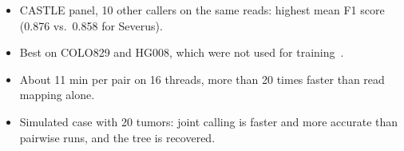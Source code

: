{\begin{enumerate}
  \begin{itemize}
  \item CASTLE panel, 10 other callers on the same reads: highest mean F1 score (0.876 vs.\ 0.858 for Severus).
  \item Best on COLO829 and HG008, which were not used for training~\cite{colo829,hg008}.
  \item About 11 min per pair on 16 threads, more than 20 times faster than read mapping alone.
  \item Simulated case with 20 tumors: joint calling is faster and more accurate than pairwise runs, and the tree is recovered.
  \end{itemize}
\end{enumerate}
}
